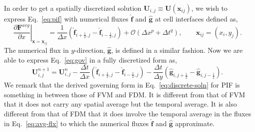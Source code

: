\documentclass[times,preprint,3p]{elsarticle}
\newcommand{\bff}{\mathbf{f}}
\newcommand{\pd}[2]{\frac{\partial #1}{\partial #2}}
\newcommand{\dt}{\Delta t}
\newcommand{\dx}{\Delta x}
\newcommand{\dy}{\Delta y}
\newcommand{\bF}{\mathbf{F}}
\newcommand{\bU}{\mathbf{U}}
\newcommand{\bg}{\mathbf{g}}
\newcommand{\bx}{\mathbf{x}}
\begin{document}
In order to get a spatially discretized solution \( \bU_{i,j} \equiv \bU(\bx_{ij}) \), we wish to express
Eq.~\eqref{eq:pif} with numerical fluxes \( \hat{\bff} \) and \( \hat{\bg} \) at cell interfaces defined as,
\begin{equation}\label{eq:num-flx}
    \left. \pd{\bF^{avg}}{x} \right|_{\bx = \bx_{ij}} =
    \frac{1}{\dx} \left( \hat{\bff}_{i + \frac{1}{2}, j} -
                                \hat{\bff}_{i - \frac{1}{2}, j} \right) +
                                \mathcal{O} (\dx^{p} + \dt^{q}), \quad \quad
    \bx_{ij} = (x_i, y_j).
\end{equation}
%
The numerical flux in \( y \)-direction, \( \hat{\bg} \), is defined in a similar fashion.
Now we are able to express Eq.~\eqref{eq:gov} in a fully discretized form as,
\begin{equation}\label{eq:discrete-soln}
    \bU^{n + 1}_{i,j} = \bU^{n}_{i, j} -
    \frac{\dt}{\dx} \left( \hat{\bff}_{i + \frac{1}{2}, j} -
                                 \hat{\bff}_{i - \frac{1}{2}, j} \right) -
    \frac{\dt}{\dy} \left( \hat{\bg}_{i, j + \frac{1}{2}} -
                                  \hat{\bg}_{i, j - \frac{1}{2}}   \right).
\end{equation}
We remark that the derived governing form in
Eq.~\eqref{eq:discrete-soln} for PIF is something
in between those of FVM and FDM. It is different from
that of FVM that it does not carry any spatial average but the temporal average.
It is also different from that of FDM
that it does involve the temporal average in the fluxes
in Eq.~\eqref{eq:avg-flx} to which the numerical
fluxes \( \hat{\bff} \) and \( \hat{\bg} \) approximate.
\end{document}
